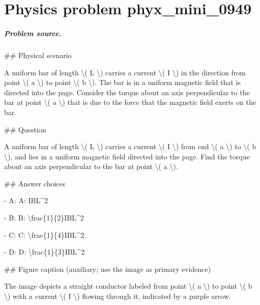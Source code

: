 
\chapter{Physics problem phyx\_mini\_0949}
\label{ch:PhyXMiniProblems_problem_phyx_mini_0949}

\paragraph{Problem source.}
\#\# Physical scenario

A uniform bar of length \textbackslash{}( L \textbackslash{}) carries a current \textbackslash{}( I \textbackslash{}) in the direction from point \textbackslash{}( a \textbackslash{}) to point \textbackslash{}( b \textbackslash{}). The bar is in a uniform magnetic field that is directed into the page. Consider the torque about an axis perpendicular to the bar at point \textbackslash{}( a \textbackslash{}) that is due to the force that the magnetic field exerts on the bar.

\#\# Question

A uniform bar of length \textbackslash{}( L \textbackslash{}) carries a current \textbackslash{}( I \textbackslash{}) from end \textbackslash{}( a \textbackslash{}) to \textbackslash{}( b \textbackslash{}), and lies in a uniform magnetic field directed into the page. Find the torque about an axis perpendicular to the bar at point \textbackslash{}( a \textbackslash{}).

\#\# Answer choices

- A: A: IBL\textasciicircum{}2

- B: B: \textbackslash{}frac\{1\}\{2\}IBL\textasciicircum{}2

- C: C: \textbackslash{}frac\{1\}\{4\}IBL\textasciicircum{}2

- D: D: \textbackslash{}frac\{1\}\{3\}IBL\textasciicircum{}2

\#\# Figure caption (auxiliary; use the image as primary evidence)

The image depicts a straight conductor labeled from point \textbackslash{}( a \textbackslash{}) to point \textbackslash{}( b \textbackslash{}) with a current \textbackslash{}( I \textbackslash{}) flowing through it, indicated by a purple arrow. 

